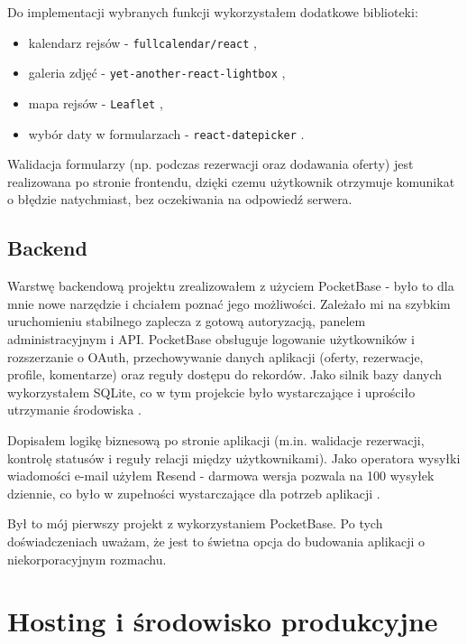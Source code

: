 \documentclass[shortabstract]{iithesis}
\begin{document}
Do implementacji wybranych funkcji wykorzystałem dodatkowe biblioteki:
\begin{itemize}
  \setlength{\itemsep}{0pt}
  \setlength{\parskip}{0pt}
  \setlength{\parsep}{0pt}
    \item kalendarz rejsów - \texttt{fullcalendar/react} \cite{fullcalendar-docs},
    \item galeria zdjęć - \texttt{yet-another-react-lightbox} \cite{yarl-docs},
    \item mapa rejsów - \texttt{Leaflet} \cite{leaflet-docs},
    \item wybór daty w formularzach - \texttt{react-datepicker} \cite{react-datepicker-docs}.
\end{itemize}

Walidacja formularzy (np. podczas rezerwacji oraz dodawania oferty) jest realizowana po stronie frontendu, dzięki czemu użytkownik otrzymuje komunikat o błędzie natychmiast, bez oczekiwania na odpowiedź serwera.

\subsection{Backend}
Warstwę backendową projektu zrealizowałem z użyciem PocketBase - było to dla mnie nowe narzędzie i chciałem poznać jego możliwości. Zależało mi na szybkim uruchomieniu stabilnego zaplecza z gotową autoryzacją, panelem administracyjnym i API. PocketBase obsługuje logowanie użytkowników i rozszerzanie o OAuth, przechowywanie danych aplikacji (oferty, rezerwacje, profile, komentarze) oraz reguły dostępu do rekordów. Jako silnik bazy danych wykorzystałem SQLite, co w tym projekcie było wystarczające i uprościło utrzymanie środowiska \cite{pocketbase-docs,sqlite-docs}.

Dopisałem logikę biznesową po stronie aplikacji (m.in. walidacje rezerwacji, kontrolę statusów i reguły relacji między użytkownikami). Jako operatora wysyłki wiadomości e-mail użyłem Resend - darmowa wersja pozwala na 100 wysyłek dziennie, co było w zupełności wystarczające dla potrzeb aplikacji \cite{resend-docs}.

Był to mój pierwszy projekt z wykorzystaniem PocketBase. Po tych doświadczeniach uważam, że jest to świetna opcja do budowania aplikacji o niekorporacyjnym rozmachu.

\section{Hosting i środowisko produkcyjne}
\end{document}

